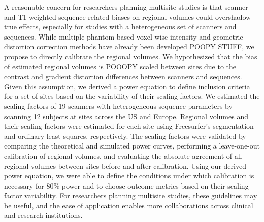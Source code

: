 
A reasonable concern for researchers planning multisite studies is that scanner and T1 weighted sequence-related biases on regional volumes could overshadow true effects, especially for studies with a heterogeneous set of scanners and sequences. While multiple phantom-based voxel-wise intensity and geometric distortion correction methods have already been developed POOPY STUFF, we propose to directly calibrate the regional volumes. We hypothesized that the bias of estimated regional volumes is POOOPY scaled between sites due to the contrast and gradient distortion differences between scanners and sequences. Given this assumption, we derived a power equation to define inclusion criteria for a set of sites based on the variability of their scaling factors. We estimated the scaling factors of 19 scanners with heterogeneous sequence parameters by scanning 12 subjects at sites across the US and Europe. Regional volumes and their scaling factors were estimated for each site using Freesurfer's segmentation and ordinary least squares, respectively. The scaling factors were validated by comparing the theoretical and simulated power curves, performing a leave-one-out calibration of regional volumes, and evaluating the absolute agreement of all regional volumes between sites before and after calibration. Using our derived power equation, we were able to define the conditions under which calibration is necessary for 80\% power and to choose outcome metrics based on their scaling factor variability. For researchers planning multisite studies, these guidelines may be useful, and the ease of application enables more collaborations across clinical and research institutions.